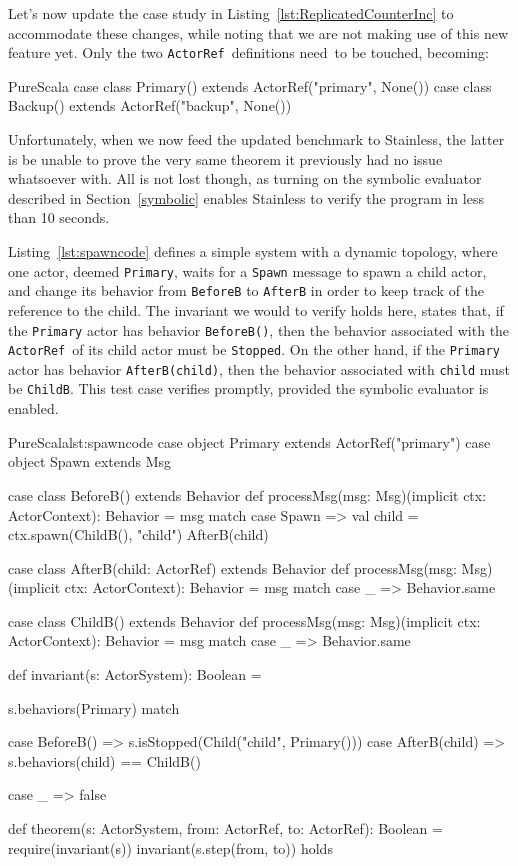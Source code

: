 \documentclass[a4paper,twoside]{article}
\newcommand{\InlineS}[1]{\lstinline[language=PureScala,basicstyle=\small\ttfamily,columns=fixed]|#1|}
\newcommand{\RefSec}[1]{Section~\ref{#1}}
\newcommand{\RefCode}[1]{Listing~\ref{#1}}
\newcommand{\ActorRef}{\InlineS{ActorRef}\ }
\newcommand{\stt}[1]{\texttt{\small{#1}}}
\begin{document}
Let's now update the case study in \RefCode{lst:ReplicatedCounterInc} to accommodate 
these changes, while noting that we are not making use of this new feature yet. Only 
the two \ActorRef definitions need to be touched, becoming:

\begin{ShortCode}{PureScala}
case class Primary() extends ActorRef("primary", None())
case class Backup()  extends ActorRef("backup", None())
\end{ShortCode}

Unfortunately, when we now feed the updated benchmark to Stainless, the latter is be 
unable to prove the very same theorem it previously had no issue whatsoever with.
All is not lost though, as turning on the symbolic evaluator described in
\RefSec{symbolic} enables Stainless to verify the program in less than 10 seconds.

\RefCode{lst:spawncode} defines a simple system with a dynamic topology, where one actor, deemed \stt{Primary}, waits for a \stt{Spawn} message to spawn a child actor, and change its behavior from \stt{BeforeB} to \stt{AfterB} in order to keep track of the reference to the child. The invariant we would to verify holds here, states that, if the \stt{Primary} actor has behavior \stt{BeforeB()}, then the behavior associated with the \ActorRef of its child actor must be \stt{Stopped}. On the other hand, if the \stt{Primary} actor has behavior \stt{AfterB(child)}, then the behavior associated with \stt{child} must be \stt{ChildB}. This test case verifies promptly, provided the symbolic evaluator is enabled.

\begin{Code}{PureScala}{lst:spawncode}{}
case object Primary extends ActorRef("primary")
case object Spawn extends Msg

case class BeforeB() extends Behavior {
  def processMsg(msg: Msg)(implicit ctx: ActorContext): Behavior = msg match {
    case Spawn =>
      val child = ctx.spawn(ChildB(), "child")
      AfterB(child)
  }
}

case class AfterB(child: ActorRef) extends Behavior {
  def processMsg(msg: Msg)(implicit ctx: ActorContext): Behavior = msg match {
    case _ => Behavior.same
  }
}

case class ChildB() extends Behavior {
  def processMsg(msg: Msg)(implicit ctx: ActorContext): Behavior = msg match {
    case _ => Behavior.same
  }
}

def invariant(s: ActorSystem): Boolean = {
  s.behaviors(Primary) match {
    case BeforeB() =>
      s.isStopped(Child("child", Primary()))
    case AfterB(child) =>
      s.behaviors(child) == ChildB()

    case _ => false
  }
}

def theorem(s: ActorSystem, from: ActorRef, to: ActorRef): Boolean = {
  require(invariant(s))
  invariant(s.step(from, to))
} holds
\end{Code}
\end{document}
